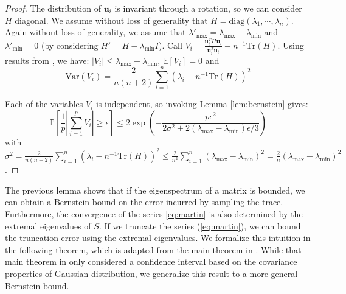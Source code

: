 \begin{proof} The distribution of $\mathbf{u}_{i}$ is invariant
through a rotation, so we can consider $H$ diagonal. We assume without
loss of generality that $H=\text{diag}\left(\lambda_{1},\cdots,\lambda_{n}\right)$.
Again without loss of generality, we assume that $\lambda'_{\max}=\lambda_{\max}-\lambda_{\min}$
and $\lambda'_{\min}=0$ (by considering $H'=H-\lambda_{\min}I$).
Call $V_{i}=\frac{\mathbf{u}_{i}^{T}H\mathbf{u}_{i}}{\mathbf{u}_{i}^{T}\mathbf{u}_{i}}-n^{-1}\text{Tr}\left(H\right)$.
Using results from \cite{Barry1999}, we have: $\left|V_{i}\right|\leq\lambda_{\max}-\lambda_{\min}$,
$\mathbb{E}\left[V_{i}\right]=0$ and 
\[
\text{Var}\left(V_{i}\right)=\frac{2}{n(n+2)}\sum_{i=1}^{n}\left(\lambda_{i}-n^{-1}\text{Tr}\left(H\right)\right)^{2}
\]


Each of the variables $V_{i}$ is independent, %
so invoking Lemma \ref{lem:bernstein} gives: 
\[
\mathbb{P}\left[\frac{1}{p}\left|\sum_{i=1}^{p}V_{i}\right|\geq\epsilon\right] \leq 2\exp\left(-\frac{p\epsilon^{2}}{2\sigma^{2}+2\left(\lambda_{\max}-\lambda_{\min}\right)\epsilon/3}\right)
\]
with $\sigma^{2}=\frac{2}{n(n+2)}\sum_{i=1}^{n}\left(\lambda_{i}-n^{-1}\text{Tr}\left(H\right)\right)^{2}\leq\frac{2}{n^{2}}\sum_{i=1}^{n}\left(\lambda_{\max}-\lambda_{\min}\right)^{2}=\frac{2}{n}\left(\lambda_{\max}-\lambda_{\min}\right)^{2}$.
\end{proof}

The previous lemma shows that if the eigenspectrum of a matrix is
bounded, we can obtain a Bernstein bound on the error incurred by sampling
the trace. Furthermore, the convergence of the series \ref{eq:martin}
is also determined by the extremal eigenvalues of $S$. If we truncate
the series (\ref{eq:martin}), we can bound the truncation error using
the extremal eigenvalues. We formalize this intuition in the following
theorem, which is adapted from the main theorem in \cite{Barry1999}.
While that main theorem in \cite{Barry1999} only considered a confidence
interval based on the covariance properties of Gaussian distribution,
we generalize this result to a more general Bernstein bound.

